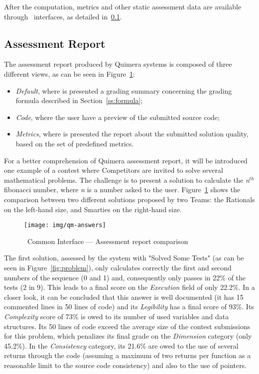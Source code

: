 After the computation, metrics and other static assessment data are available through \quim\ interfaces, as detailed in~\ref{s:grading}.



\subsection{Assessment Report}\label{s:grading}

The assessment report produced by Quimera systems is composed of three different views, as can be seen in Figure~\ref{fig:answers}: 

\begin{itemize}

\item \emph{Default}, where is presented a grading summary concerning the grading formula described in Section~\ref{ss:formula};

\item \emph{Code}, where the user have a preview of the submitted source code;

\item \emph{Metrics}, where is presented the report about the submitted solution quality, based on the set of predefined metrics.

\end{itemize}

For a better comprehension of Quimera assessment report, it will be introduced one example of a contest where \textsf{Competitors} are invited to solve several mathematical problems. %
The challenge is to present a solution to calculate the \emph{n$^{th}$} fibonacci number, where \emph{n} is a number asked to the user.
Figure~\ref{fig:answers} shows the comparison between two different solutions proposed by two \textsf{Teams}: the \textsf{Rationals} on the left-hand size, and \textsf{Smarties} on the right-hand size.

\begin{figure}[h]
\centering
\texttt{[image: img/qm-answers]}
\caption{\quim\ Common Interface ---  Assessment report comparison}\label{fig:answers}
\end{figure}

The first solution, assessed by the system with "Solved Some Tests" (as can be seen in Figure~\ref{fig:problem}), only calculates correctly the first and second numbers of the sequence (0 and 1) and, consequently only passes in 22\% of the tests (2 in 9).
This leads to a final score on the \emph{Execution} field of only 22.2\%. 
In a closer look, it can be concluded that this answer is well documented (it has 15 commented lines in 50 lines of code) and its \emph{Legibility} has a final score of 93\%.
Its \emph{Complexity} score of 73\% is owed to its number of used variables and data structures.
Its 50 lines of code exceed the average size of the contest submissions for this problem, which penalizes its final grade on the \emph{Dimension} category (only 45.2\%).
In the \emph{Consistency} category, its 21.6\% are owed to the use of several returns through the code (assuming a maximum of two returns per function as a reasonable limit to the source code consistency) and also to the use of pointers.

